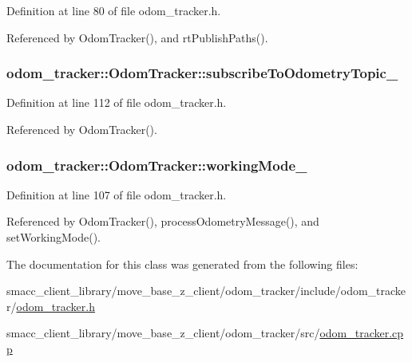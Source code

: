 Definition at line 80 of file odom\+\_\+tracker.\+h.



Referenced by Odom\+Tracker(), and rt\+Publish\+Paths().

\subsubsection[{\texorpdfstring{subscribe\+To\+Odometry\+Topic\+\_\+}{subscribeToOdometryTopic_}}]{ odom\+\_\+tracker\+::\+Odom\+Tracker\+::subscribe\+To\+Odometry\+Topic\+\_\+\hspace{0.3cm}{\ttfamily [protected]}}\hypertarget{classodom__tracker_1_1OdomTracker_ae8ddf26c78b4bb30b162d30721d761f6}{}\label{classodom__tracker_1_1OdomTracker_ae8ddf26c78b4bb30b162d30721d761f6}


Definition at line 112 of file odom\+\_\+tracker.\+h.



Referenced by Odom\+Tracker().

\subsubsection[{\texorpdfstring{working\+Mode\+\_\+}{workingMode_}}]{ odom\+\_\+tracker\+::\+Odom\+Tracker\+::working\+Mode\+\_\+\hspace{0.3cm}{\ttfamily [protected]}}\hypertarget{classodom__tracker_1_1OdomTracker_ab3b29200405d9a88cf3213656b14d7c0}{}\label{classodom__tracker_1_1OdomTracker_ab3b29200405d9a88cf3213656b14d7c0}


Definition at line 107 of file odom\+\_\+tracker.\+h.



Referenced by Odom\+Tracker(), process\+Odometry\+Message(), and set\+Working\+Mode().



The documentation for this class was generated from the following files\+:\begin{DoxyCompactItemize}
\item 
smacc\+\_\+client\+\_\+library/move\+\_\+base\+\_\+z\+\_\+client/odom\+\_\+tracker/include/odom\+\_\+tracker/\hyperlink{odom__tracker_8h}{odom\+\_\+tracker.\+h}\item 
smacc\+\_\+client\+\_\+library/move\+\_\+base\+\_\+z\+\_\+client/odom\+\_\+tracker/src/\hyperlink{odom__tracker_8cpp}{odom\+\_\+tracker.\+cpp}\end{DoxyCompactItemize}
